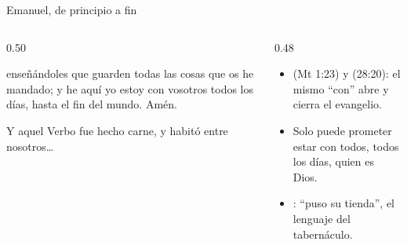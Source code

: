 \begin{frame}{Emanuel, de principio a fin}
\begin{columns}[t,onlytextwidth]
\begin{column}{0.50\textwidth}
\begin{cita}[fontupper=\scriptsize\itshape]enseñándoles que guarden todas las cosas que os he mandado; y he aquí yo estoy con vosotros todos los días, hasta el fin del mundo. Amén.\end{cita}
\begin{cita}[fontupper=\scriptsize\itshape]Y aquel Verbo fue hecho carne, y habitó entre nosotros\ldots{}\end{cita}
\end{column}
\begin{column}{0.48\textwidth}\small
\begin{itemize}
\item {} (Mt 1:23) y  (28:20): el mismo ``con'' abre y cierra el evangelio.
\item Solo puede prometer estar con todos, todos los días, quien es Dios.
\item {}: ``puso su tienda'', el lenguaje del tabernáculo.
\end{itemize}
\end{column}
\end{columns}
\end{frame}

